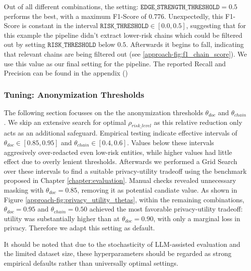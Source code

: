 Out of all different combinations, the setting: $\texttt{EDGE\_STRENGTH\_THRESHOLD} = 0.5$ performs the best, with a maximum F1-Score of 0.776. Unexpectedly, this F1-Score is constant in the interval $\texttt{RISK\_THRESHOLD} \in [0.0,0.5]$, suggesting that for this example the pipeline didn't extract lower-risk chains which could be filtered out by setting $\texttt{RISK\_THRESHOLD}$ below $0.5$. Afterwards it begins to fall, indicating that relevant chains are being filtered out (see \ref{approach-fig:f1_chain_score}). We use this value as our final setting for the pipeline. The reported Recall and Precision can be found in the appendix () %

\subsubsection{Tuning: Anonymization Thresholds}
The following section focusses on the the anonymization thresholds $\theta_{doc}$ and $\theta_{chain}$. We skip an extensive search for optimal $\rho_{risk\_level}$ as this relative reduction only acts as an additional safeguard.
Empirical testing indicate effective intervals of $\theta_{doc}\in[0.85,0.95]$ and $\theta_{chain}\in[0.4,0.6]$. Values below these intervals aggresively over-redacted even low-risk entities, while higher values had little effect due to overly lenient thresholds. Afterwards we performed a Grid Search over these intervals to find a suitable privacy-utility tradeoff using the benchmark proposed in Chapter \ref{chapter:evaluation}. Manual checks revealed unnecessary masking with $\theta_{doc}=0.85$, removing it as potential candiate value. As shown in Figure \ref{approach-fig:privacy_utility_thetas}, within the remaining combinations, $\theta_{doc}=0.95$ and $\theta_{chain}=0.50$ achieved the most favorable privacy-utility tradeoff: utility was substantially higher than at $\theta_{doc}=0.90$, with only a marginal loss in privacy. Therefore we adapt this setting as default.  
 
It should be noted that due to the stochasticity of LLM-assisted evaluation and the limited dataset size, these hyperparameters should be regarded as strong empirical defaults rather than universally optimal settings.
 
